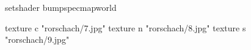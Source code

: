 setshader bumpspecmapworld

    texture c "rorschach/7.jpg"
    texture n "rorschach/8.jpg"
    texture s "rorschach/9.jpg"
